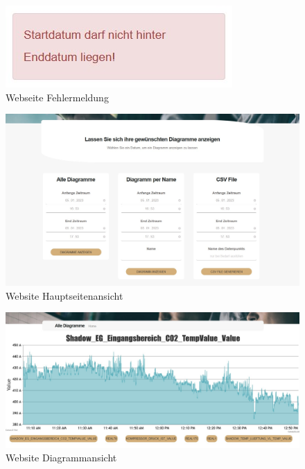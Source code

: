 \begin{figure}
    \centering
    \includegraphics[scale=1]{pics/FlexLoggerWebsite_Fehlermeldung.jpg}
    \caption{Webseite Fehlermeldung}
    \label{fig:impl:FlexLoggerHauptseitenAnsichtFehlermeldung}
\end{figure}
 
 
\begin{figure}
    \centering
    \includegraphics[scale=0.45]{pics/FlexLoggerWebsiteFormulare.jpg}
    \caption{Website Hauptseitenansicht}
    \label{fig:impl:FlexLoggerHauptseitenAnsicht}
\end{figure}
 
\begin{figure}
    \centering
    \includegraphics[scale=0.35]{pics/FlexLoggerWebsiteDiagramm.jpg}
    \caption{Website Diagrammansicht}
    \label{fig:impl:FlexLoggerDiagrammAnsicht}
\end{figure}
 
